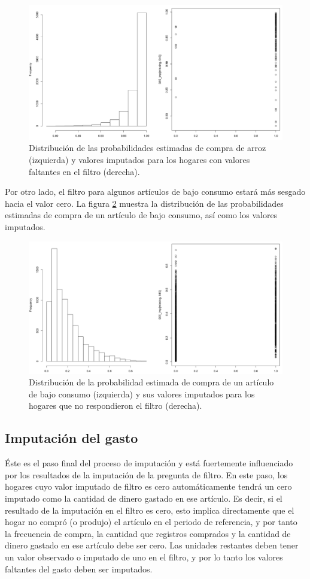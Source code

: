 \documentclass[
  12pt,
]{book}
\begin{document}
\begin{figure}
\includegraphics[width=0.5\linewidth]{Pics/11} \caption{Distribución de las probabilidades estimadas de compra de arroz (izquierda) y valores imputados para los hogares con valores faltantes en el filtro (derecha).}\label{fig:fig11}
\end{figure}

Por otro lado, el filtro para algunos artículos de bajo consumo estará más sesgado hacia el valor cero. La figura \ref{fig:fig12} muestra la distribución de las probabilidades estimadas de compra de un artículo de bajo consumo, así como los valores imputados.

\begin{figure}
\includegraphics[width=0.5\linewidth]{Pics/12} \caption{Distribución de la probabilidad estimada de compra de un artículo de bajo consumo (izquierda) y sus valores imputados para los hogares que no respondieron el filtro (derecha).}\label{fig:fig12}
\end{figure}

\hypertarget{imputaciuxf3n-del-gasto}{%
\subsection{Imputación del gasto}\label{imputaciuxf3n-del-gasto}}

Éste es el paso final del proceso de imputación y está fuertemente influenciado por los resultados de la imputación de la pregunta de filtro. En este paso, los hogares cuyo valor imputado de filtro es cero automáticamente tendrá un cero imputado como la cantidad de dinero gastado en ese artículo. Es decir, si el resultado de la imputación en el filtro es cero, esto implica directamente que el hogar no compró (o produjo) el artículo en el periodo de referencia, y por tanto la frecuencia de compra, la cantidad que registros comprados y la cantidad de dinero gastado en ese artículo debe ser cero. Las unidades restantes deben tener un valor observado o imputado de uno en el filtro, y por lo tanto los valores faltantes del gasto deben ser imputados.
\end{document}
